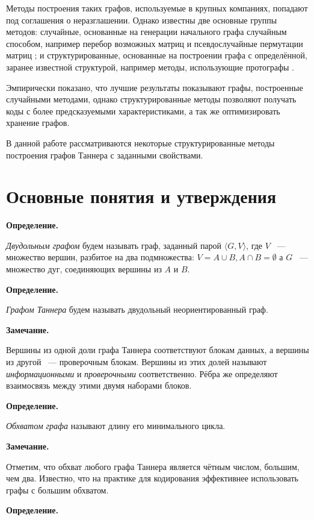 \documentclass[14pt]{mmcs-article}
\begin{document}
Методы построения таких графов, используемые в крупных компаниях, попадают под соглашения о неразглашении. Однако известны две основные группы методов: случайные, основанные на генерации начального графа случайным способом, например перебор возможных матриц \cite{bruteforce} и псевдослучайные пермутации матриц \cite{gallager}; и структурированные, основанные на построении графа с определённой, заранее известной структурой, например методы, использующие протографы \cite{protographs}.

Эмпирически показано, что лучшие результаты показывают графы, построенные случайными методами, однако структурированные методы позволяют получать коды с более предсказуемыми характеристиками, а так же оптимизировать хранение графов. 

В данной работе рассматриваются некоторые структурированные методы построения графов Таннера с заданными свойствами.

\newpage
\section{Основные понятия и утверждения}

\textbf{Определение.}

\textsl{Двудольным графом} будем называть граф, заданный парой $\langle G, V \rangle$, где $V$ ~--- множество вершин, разбитое на два подмножества: $V = A \cup B, A \cap B = \emptyset$ а $G$ ~--- множество дуг, соединяющих вершины из $A$ и $B$.

\textbf{Определение.}

\textsl{Графом Таннера} будем называть двудольный неориентированный граф.

\textbf{Замечание.}

Вершины из одной доли графа Таннера соответствуют блокам данных, а вершины из другой ~--- проверочным блокам. Вершины из этих долей называют \textsl{информационными} и \textsl{проверочными} соответственно. Рёбра же определяют взаимосвязь между этими двумя наборами блоков.

\textbf{Определение.}

\textsl{Обхватом графа} называют длину его минимального цикла.

\textbf{Замечание.}

Отметим, что обхват любого графа Таннера является чётным числом, большим, чем два. Известно, что на практике для кодирования эффективнее использовать графы с большим обхватом.

\textbf{Определение.}
\end{document}
